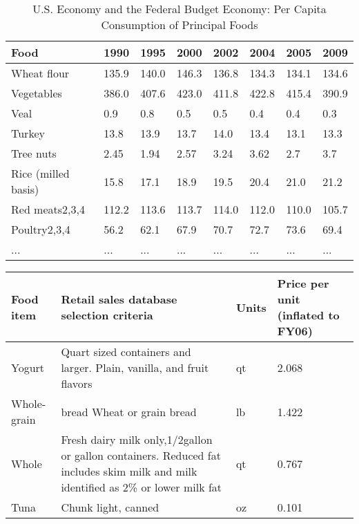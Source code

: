 \begin{itemize}
\iffalse
	\begin{table*}[t]
		\setlength{\tabcolsep}{0.9\tabcolsep}
		\begin{tabular}{ |l|l|l|l|l|l|l|l|  }
			\hline
			Food&	1990&	1995&	2000&	2002&	2004&	2005&	2009\\
			\hline
			Wheat flour& 	135.9& 	140.0& 	146.3& 	136.8& 	134.3& 	134.1& 	134.6\\
			Vegetables& 	386.0& 	407.6& 	423.0& 	411.8& 	422.8& 	415.4& 	390.9\\
			Veal& 	0.9& 	0.8& 	0.5& 	0.5& 	0.4& 	0.4& 	0.3\\
			Turkey& 	13.8& 	13.9& 	13.7& 	14.0& 	13.4& 	13.1& 	13.3\\
			Tree nuts& 	2.45& 	1.94& 	2.57& 	3.24& 	3.62& 	2.7& 	3.7\\
			Rice (milled basis)& 	15.8& 	17.1& 	18.9& 	19.5& 	20.4& 	21.0& 	21.2\\
			Red meats2,3,4& 	112.2& 	113.6& 	113.7& 	114.0& 	112.0& 	110.0& 	105.7\\
			Poultry2,3,4& 	56.2& 	62.1& 	67.9& 	70.7& 	72.7& 	73.6& 	69.4\\
			... & ...& ...& ...& ...& ...& ...& ...\\
			\hline
			
		\end{tabular}
		\vspace{.2cm}
		\caption{ U.S. Economy and the Federal Budget Economy: Per Capita Consumption of Principal Foods \label{tab:q1-result1}}
	\end{table*}
	
	\begin{table*}[!ht]
	\setlength\extrarowheight{2pt} %
		\begin{tabular}{ |l|p{8cm}|l|p{4cm}|  }
			\hline
			\textbf{Food item}&	\textbf{Retail sales database selection criteria}&	\textbf{Units}&	\textbf{Price per unit (inflated to FY06)}\\
			\hline
			
			Yogurt& 	Quart sized containers and larger. Plain, vanilla, and fruit flavors& 	qt& 	2.068\\\hline
			Whole-grain& bread 	Wheat or grain bread& 	lb& 	1.422\\\hline
			Whole& 	Fresh dairy milk only,1/2gallon or gallon containers. Reduced fat includes skim milk and milk identified as 2\% or lower milk fat& 	qt& 	0.767\\\hline

			Tuna& 	Chunk light, canned& 	oz& 	0.101\\\hline
		

\end{tabular}
\end{table*}
\end{itemize}
